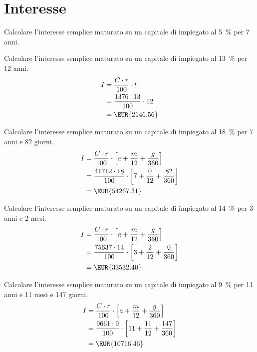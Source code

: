 \section{Interesse}
\begin{exercise}[no solution]
	Calcolare l'interesse semplice maturato su un capitale di  impiegato al \SI{5}{\percent} per \num{7} anni.
 
\end{exercise} 
\begin{exercise}
	Calcolare l'interesse semplice maturato su un capitale di  impiegato al \SI{13}{\percent} per \num{12} anni.
	\tcblower
	\begin{align*}
		I={}&\dfrac{C\cdot r}{100}\cdot t\\
		={}&\dfrac{1376\cdot 13}{100}\cdot 12\\
	={}&\mbox{\EUR{2146.56}}
	\end{align*}
\end{exercise} 
\begin{exercise}
	Calcolare l'interesse semplice maturato su un capitale di  impiegato al \SI{18}{\percent} per \num{7} anni e \num{82} giorni.
	\tcblower
	\begin{align*}
		I={}&\dfrac{C\cdot r}{100}\cdot\left[a+ \dfrac{m}{12}+\dfrac{g}{360}\right]\\
		={}&\dfrac{41712\cdot 18}{100}\cdot\left[7+ \dfrac{0}{12}+\dfrac{82}{360}\right]\\
		={}&\mbox{\EUR{54267.31}}
	\end{align*}
\end{exercise} 
\begin{exercise}
	Calcolare l'interesse semplice maturato su un capitale di  impiegato al \SI{14}{\percent} per \num{3} anni e \num{2} mesi.
	\tcblower
	\begin{align*}
		I={}&\dfrac{C\cdot r}{100}\cdot\left[a+ \dfrac{m}{12}+\dfrac{g}{360}\right]\\
		={}&\dfrac{75637\cdot 14}{100}\cdot\left[3+ \dfrac{2}{12}+\dfrac{0}{360}\right]\\
		={}&\mbox{\EUR{33532.40}}
	\end{align*}
\end{exercise} 
\begin{exercise}
	Calcolare l'interesse semplice maturato su un capitale di  impiegato al \SI{9}{\percent} per \num{11} anni e \num{11} mesi e \num{147} giorni.
	\tcblower
	\begin{align*}
		I={}&\dfrac{C\cdot r}{100}\cdot\left[a+ \dfrac{m}{12}+\dfrac{g}{360}\right]\\
		={}&\dfrac{9661\cdot 9}{100}\cdot\left[11+ \dfrac{11}{12}+\dfrac{147}{360}\right]\\
		={}&\mbox{\EUR{10716.46}}
	\end{align*}
\end{exercise} 
